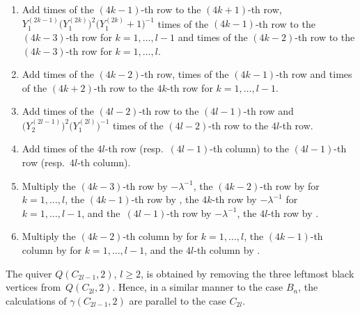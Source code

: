 \documentclass[10pt,a4paper]{amsart}
\numberwithin{equation}{section}
\begin{document}
	\begin{enumerate}\itemsep=0pt
		\item Add  times of the $(4k-1)$-th row to the $(4k+1)$-th row, $Y_1^{(2k-1)}\bigl(Y_1^{(2k)}\bigr)^2\bigl(Y_1^{(2k)}+1\bigr)^{-1}$ times of the $(4k-1)$-th row to the $(4k-3)$-th row for $k=1,\dots,l-1$ and  times of the $(4k-2)$-th row to the $(4k-3)$-th row for $k=1,\dots,l$.
		
\item Add  times of the $(4k-2)$-th row,  times of the $(4k-1)$-th row and  times of the $(4k+2)$-th row to the $4k$-th row for $k=1,\dots, l-1$.
		
\item Add  times of the $(4l-2)$-th row to the $(4l-1)$-th row and $\bigl(Y_2^{(2l-1)}\bigr)^2\bigl(Y_1^{(2l)}\bigr)^{-1}$ times of the $(4l-2)$-th row to the $4l$-th row.
		
\item Add  times of the $4l$-th row (resp.\ $(4l-1)$-th column) to the $(4l-1)$-th row (resp.\ $4l$-th column).
		
\item Multiply the $(4k-3)$-th row by $-\lambda^{-1}$, the $(4k-2)$-th row by  for $k=1,\dots,l$, the $(4k-1)$-th row by , the $4k$-th row by $-\lambda^{-1}$ for $k=1,\dots,l-1$, and the~${(4l-1)}$-th row by $-\lambda^{-1}$, the $4l$-th row by .
		
\item Multiply the $(4k-2)$-th column by  for $k=1,\dots,l$, the $(4k-1)$-th column by  for $k=1,\dots,l-1$, and the $4l$-th column by .
	\end{enumerate}
	
The quiver $Q(C_{2l-1},2)$, $l\geq2$, is obtained by removing the three leftmost black vertices from~$Q(C_{2l},2)$.
Hence, in a similar manner to the case $B_n$, the calculations of $\gamma(C_{2l-1},2)$ are parallel to the case $C_{2l}$.
\end{document}
